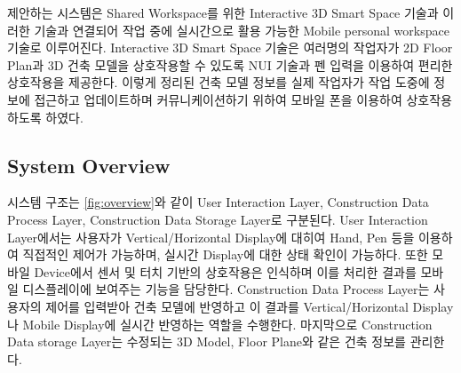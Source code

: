 제안하는 시스템은 Shared Workspace를 위한 Interactive 3D Smart Space 기술과 이러한 기술과 연결되어 작업 중에 실시간으로 활용 가능한 Mobile personal workspace 기술로 이루어진다. Interactive 3D Smart Space 기술은 여러명의 작업자가 2D Floor Plan과 3D 건축 모델을 상호작용할 수 있도록 NUI 기술과 펜 입력을 이용하여 편리한 상호작용을 제공한다. 이렇게 정리된 건축 모델 정보를 실제 작업자가 작업 도중에 정보에 접근하고 업데이트하며 커뮤니케이션하기 위하여 모바일 폰을 이용하여 상호작용하도록 하였다.

\subsection{System Overview}

시스템 구조는 \ref{fig:overview}와 같이 User Interaction Layer, Construction Data Process Layer, Construction Data Storage Layer로 구분된다. User Interaction Layer에서는 사용자가 Vertical/Horizontal Display에 대히여 Hand, Pen 등을 이용하여 직접적인 제어가 가능하며, 실시간 Display에 대한 상태 확인이 가능하다. 또한 모바일 Device에서 센서 및 터치 기반의 상호작용은 인식하며 이를 처리한 결과를 모바일 디스플레이에 보여주는 기능을 담당한다. Construction Data Process Layer는 사용자의 제어를 입력받아 건축 모델에 반영하고 이 결과를 Vertical/Horizontal Display나 Mobile Display에 실시간 반영하는 역할을 수행한다. 마지막으로 Construction Data storage Layer는 수정되는 3D Model, Floor Plane와 같은 건축 정보를 관리한다.

